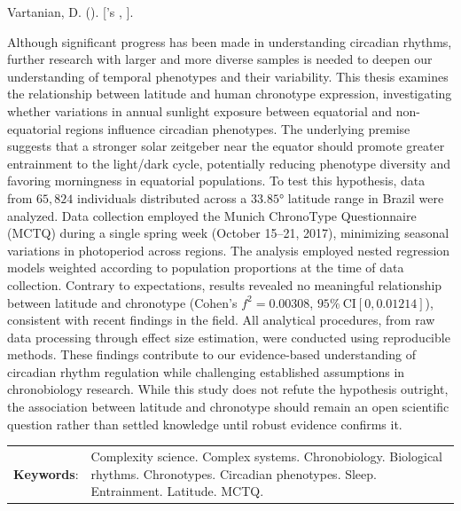 \documentclass[
12pt,
openright,
oneside,
a4paper,
chapter=TITLE,
section=TITLE,
french,
spanish,
brazil,
english
]{abntex2}
\renewcommand{\resumoname}{Abstract}
\renewcommand{\resumoname}{Resumo}
\renewcommand{\resumoname}{Resumen}
\renewcommand{\resumoname}{Résumé}
\providecommand{\imprimiruniversidade}{}
\providecommand{\imprimirtipodetituloacademico}{}
\newenvironment{resumoenv}[1][\resumoname]{
  \pretextualchapter{#1}
  \begingroup
  \setlength{\parindent}{0cm}
  \setlength{\parskip}{\smallskipamount} %
  \AtBeginEnvironment{tabular}{\normalsize}
  \renewcommand{\arraystretch}{1}
  \setlength{\aboverulesep}{0ex}
  \setlength{\belowrulesep}{0ex}
  \setlength{\arrayrulewidth}{0pt}
  \setlength{\tabcolsep}{0cm}
  \vspace{-\smallskipamount} %
  \begin{SingleSpace}
}{
  \end{SingleSpace}
  \cleardoublepage
  \endgroup
}
\renewcommand{\arraystretch}{1.5}
\begin{document}
\begin{resumoenv}[\resumoname]
Vartanian, D. ({\imprimirdata}). \textit{\imprimirtitulo} [{\imprimirtipodetituloacademico}'s {\imprimirtipotrabalho}, {\imprimiruniversidade}].


Although significant progress has been made in understanding circadian
rhythms, further research with larger and more diverse samples is needed
to deepen our understanding of temporal phenotypes and their
variability. This thesis examines the relationship between latitude and
human chronotype expression, investigating whether variations in annual
sunlight exposure between equatorial and non-equatorial regions
influence circadian phenotypes. The underlying premise suggests that a
stronger solar zeitgeber near the equator should promote greater
entrainment to the light/dark cycle, potentially reducing phenotype
diversity and favoring morningness in equatorial populations. To test
this hypothesis, data from \(65,824\) individuals distributed across a
\(33.85°\) latitude range in Brazil were analyzed. Data collection
employed the Munich ChronoType Questionnaire (MCTQ) during a single
spring week (October 15--21, 2017), minimizing seasonal variations in
photoperiod across regions. The analysis employed nested regression
models weighted according to population proportions at the time of data
collection. Contrary to expectations, results revealed no meaningful
relationship between latitude and chronotype (Cohen's \(f^2 = 0.00308\),
\(95\% \ \text{CI}[0, 0.01214]\)), consistent with recent findings in
the field. All analytical procedures, from raw data processing through
effect size estimation, were conducted using reproducible methods. These
findings contribute to our evidence-based understanding of circadian
rhythm regulation while challenging established assumptions in
chronobiology research. While this study does not refute the hypothesis
outright, the association between latitude and chronotype should remain
an open scientific question rather than settled knowledge until robust
evidence confirms it.


\begin{tabular}{p{2.5cm} p{13.4cm}}
  \textbf{Keywords}: & Complexity science. Complex systems. Chronobiology. Biological rhythms. Chronotypes. Circadian phenotypes. Sleep. Entrainment. Latitude. MCTQ.
\end{tabular}
\end{resumoenv}
\end{document}
